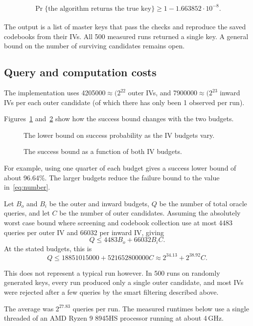 \documentclass[11pt]{article}
\begin{document}
\[
\boxed{\Pr\{\text{the algorithm returns the true key}\}
       \ge 1-1.663852\cdot10^{-8}.}
\]\\

The output is a list of master keys that pass the checks and reproduce
the saved codebooks from their IVs. All 500 measured runs returned a
single key. A general bound on the number of surviving candidates
remains open.


\subsection{Query and computation costs}\label{sec:effort}
The implementation uses 4205000$\approx (2^{22}$ outer IVs, and
7900000$\approx (2^{23}$ inward IVs per each outer candidate (of which there has only been 1 observed per run).

Figures~\ref{fig:2d} and~\ref{fig:3d} show how the success bound changes
with the two budgets.

\begin{figure}[htbp]
	\centering
	
	\caption{The lower bound on success probability as the IV budgets vary.}
	\label{fig:2d}
\end{figure}
\begin{figure}[htbp]
	\centering
	
	\caption{The success bound as a function of both IV budgets.}
	\label{fig:3d}
\end{figure}

For example, using one quarter of each budget gives a success lower
bound of about 96.64\%. The larger budgets reduce the failure bound to
the value in~\eqref{eq:number}.

Let \(B_o\) and \(B_i\) be the outer and inward budgets, \(Q\) be the number of total oracle queries, and let \(C\)
be the number of outer candidates. Assuming the absolutely worst case bound where screening and codebook collection use
at most 4483 queries per outer IV and 66032 per inward IV, giving
\[
 Q\le4483B_o+66032B_iC.
\]
At the stated budgets, this is
\[
 Q\le18851015000+521652800000C
   \approx2^{34.13}+2^{38.92}C.
\]

This does not represent a typical run however. In 500 runs on randomly generated keys, every run produced only a single outer
candidate, and most IVs were rejected after a few queries by the smart filtering described above. 

The average
was \(2^{27.83}\) queries per run. The measured runtimes below use a single threaded of an AMD Ryzen 9 8945HS processor running
at about 4\,GHz.\\
\end{document}
